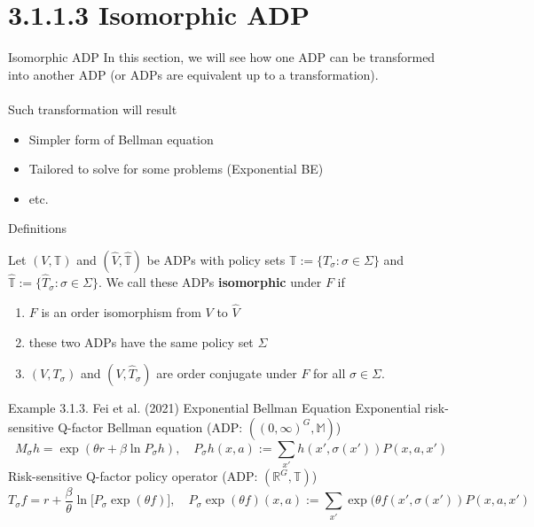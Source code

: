 \section{3.1.1.3 Isomorphic ADP}
\begin{frame}{Isomorphic ADP}
    In this section, we will see how one ADP can be transformed into another ADP (or ADPs are equivalent up to a transformation). \\
    \\
    Such transformation will result
    \begin{itemize}
        \item Simpler form of Bellman equation
        \item Tailored to solve for some problems (Exponential BE)
        \item etc. 
    \end{itemize}
\end{frame}
\begin{frame}{Definitions}
    \begin{definition}
        Let $(V,\mathbb{T})$ and $(\hat V,\hat{\mathbb{T}})$ be ADPs with policy sets $\mathbb{T}:= \{T_\sigma:\sigma\in\Sigma\}$ and $\hat{\mathbb{T}}:= \{\hat T_\sigma :\sigma \in\Sigma\}$. We call these ADPs \textbf{isomorphic} under $F$ if
        \begin{enumerate}
            \item $F$ is an order isomorphism from $V$ to $\hat V$
            \item these two ADPs have the same policy set $\Sigma$
            \item $(V,T_\sigma)$ and $(V,\hat T_\sigma)$ are order conjugate under $F$ for all $\sigma\in\Sigma$.
        \end{enumerate}
    \end{definition}
\end{frame}

\begin{frame}{Example 3.1.3. Fei et al. (2021) Exponential Bellman Equation}
    Exponential risk-sensitive Q-factor Bellman equation (ADP: $((0,\infty)^G,\mathbb{M})$)
    $$
    M_\sigma h = \exp (\theta r + \beta\ln P_\sigma h), \quad P_\sigma h(x,a):= \sum_{x'} h(x',\sigma(x')) P(x,a,x')
    $$
    Risk-sensitive Q-factor policy operator (ADP: $(\mathbb{R}^G, \mathbb{T})$)
    $$
    T_\sigma f = r+\frac{\beta}{\theta} \ln \bigg[P_\sigma \exp(\theta f)\bigg],\quad P_\sigma\exp(\theta f)(x,a):= \sum_{x'} \exp(\theta f(x',\sigma(x')) P(x,a,x')
    $$
\end{frame}

